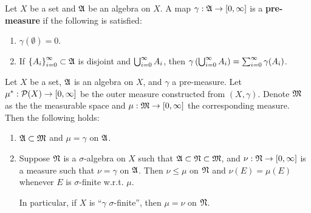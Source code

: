 \documentclass[a4paper]{article}
\begin{document}
\begin{defi}
Let $X$ be a set and $\mathfrak{A}$ be an algebra on $X$. A map 
$\gamma: \mathfrak{A} \to [0, \infty]$ is a \textbf{pre-measure}
if the following is satisfied:
\begin{enumerate}
  \item $\gamma(\emptyset) = 0$. 
  \item If $\left\{ A_i \right\}_{i=0}^\infty \subset \mathfrak{A}$ is disjoint and 
  $\bigcup_{i=0}^\infty A_i$, then $\gamma \left( \bigcup_{i=0}^\infty A_i \right)
  = \sum_{i=0}^\infty \gamma(A_i)$.
\end{enumerate}

\end{defi}

\begin{thm}
Let $X$ be a set, $\mathfrak{A}$ is an algebra on $X$, and 
$\gamma$ a pre-measure. Let $\mu^* : \mathcal{P} (X) \to [0, \infty]$
be the outer measure constructed from $(X, \gamma)$.
Denote $\mathfrak{M}$ as the the measurable space and 
$\mu: \mathfrak{M} \to [0, \infty]$ the corresponding measure.
Then the following holds: 
\begin{enumerate}
  \item $\mathfrak{A} \subset \mathfrak{M}$ and $\mu = \gamma$ on $\mathfrak{A}$.
  
  \item Suppose $\mathfrak{N}$ is a $\sigma$-algebra on $X$ 
  such that $\mathfrak{A} \subset \mathfrak{N} \subset \mathfrak{M}$, and 
  $\nu: \mathfrak{N} \to [0, \infty]$ is a measure such that 
  $\nu = \gamma$ on $\mathfrak{A}$. Then $\nu \leq \mu$ on $\mathfrak{N}$
  and $\nu(E) = \mu(E)$ whenever $E$ is $\sigma$-finite 
  w.r.t. $\mu$. 
  
  In particular, if $X$ is ``$\gamma$ $\sigma$-finite'',
  then $\mu = \nu$ on $\mathfrak{N}$.
\end{enumerate}
\end{thm}
\end{document}
